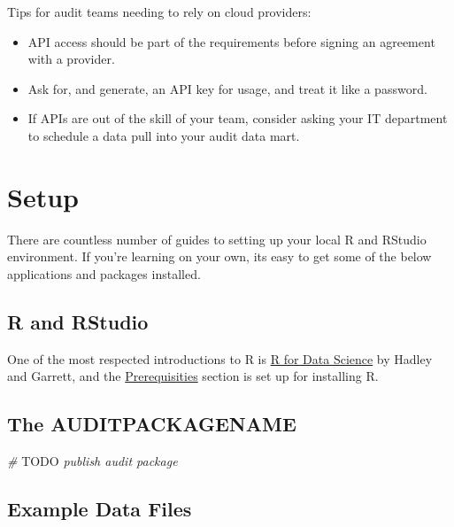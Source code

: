 \documentclass[
]{book}
\newenvironment{Shaded}{\begin{snugshade}}{\end{snugshade}}
\newcommand{\AlertTok}[1]{\textcolor[rgb]{0.94,0.16,0.16}{#1}}
\newcommand{\CommentTok}[1]{\textcolor[rgb]{0.56,0.35,0.01}{\textit{#1}}}
\providecommand{\tightlist}{%
  \setlength{\itemsep}{0pt}\setlength{\parskip}{0pt}}
\begin{document}
Tips for audit teams needing to rely on cloud providers:

\begin{itemize}
\tightlist
\item
  API access should be part of the requirements before signing an agreement with a provider.
\item
  Ask for, and generate, an API key for usage, and treat it like a password.
\item
  If APIs are out of the skill of your team, consider asking your IT department to schedule a data pull into your audit data mart.
\end{itemize}

\hypertarget{setup}{%
\chapter{Setup}\label{setup}}

There are countless number of guides to setting up your local R and RStudio environment. If you're learning on your own, its easy to get some of the below applications and packages installed.

\hypertarget{r-and-rstudio-1}{%
\section{R and RStudio}\label{r-and-rstudio-1}}

One of the most respected introductions to R is \href{https://r4ds.had.co.nz/introduction.html}{R for Data Science} by Hadley and Garrett, and the \href{https://r4ds.had.co.nz/introduction.html\#prerequisites}{Prerequisities} section is set up for installing R.

\hypertarget{the-auditpackagename}{%
\section{The AUDITPACKAGENAME}\label{the-auditpackagename}}

\begin{Shaded}
\begin{Highlighting}[]
\CommentTok{# }\AlertTok{TODO}\CommentTok{ publish audit package}
\end{Highlighting}
\end{Shaded}

\hypertarget{example-data-files}{%
\section{Example Data Files}\label{example-data-files}}
\end{document}
